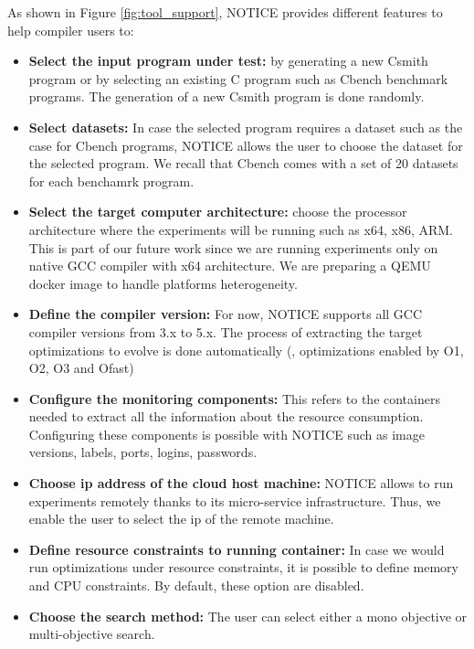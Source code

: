 As shown in Figure \ref{fig:tool_support}, NOTICE provides different features to help compiler users to:
\begin{itemize} 
	
	
	\item \textbf{Select the input program under test:} by generating a new Csmith program or by selecting an existing C program such as Cbench benchmark programs. The generation of a new Csmith program is done randomly.
	
	\item \textbf{Select datasets:} In case the selected program requires a dataset such as the case for Cbench programs, NOTICE allows the user to choose the dataset for the selected program. We recall that Cbench comes with a set of 20 datasets for each benchamrk program.
	
	\item \textbf{Select the target computer architecture:} choose the processor architecture where the experiments will be running such as x64, x86, ARM. This is part of our future work since we are running experiments only on native GCC compiler with x64 architecture. We are preparing a QEMU docker image to handle platforms heterogeneity.
	
	\item \textbf{Define the compiler version:} For now, NOTICE supports all GCC compiler versions from 3.x to 5.x. The process of extracting the target optimizations to evolve is done automatically (\ie, optimizations enabled by O1, O2, O3 and Ofast)
	
	\item \textbf{Configure the monitoring components:} This refers to the containers needed to extract all the information about the resource consumption. Configuring these components is possible with NOTICE such as image versions, labels, ports, logins, passwords.
	
	\item \textbf{Choose ip address of the cloud host machine:} NOTICE allows to run experiments remotely thanks to its micro-service infrastructure. Thus, we enable the user to select the ip of the remote machine.
	
	\item \textbf{Define resource constraints to running container:} In case we would run optimizations under resource constraints, it is possible to define memory and CPU constraints. By default, these option are disabled.
	
	\item \textbf{Choose the search method:} The user can select either a mono objective or multi-objective search.
	

\end{itemize}
